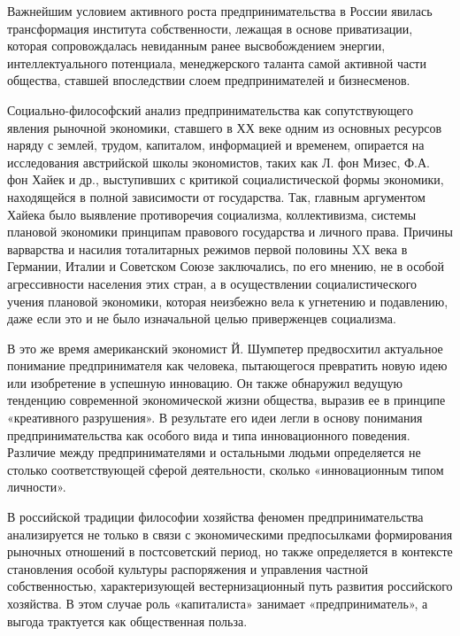 \documentclass[a4paper, 12pt]{article}%
\begin{document}
Важнейшим условием активного роста предпринимательства в России явилась трансформация института собственности, лежащая в основе приватизации, которая сопровождалась невиданным ранее высвобождением энергии, интеллектуального потенциала, менеджерского таланта самой активной части общества, ставшей впоследствии слоем предпринимателей и бизнесменов.

Социально-философский анализ предпринимательства как сопутствующего явления рыночной экономики, ставшего в ХХ веке одним из основных ресурсов наряду с землей, трудом, капиталом, информацией и временем, опирается на исследования австрийской школы экономистов, таких как Л. фон Мизес, Ф.А. фон Хайек и др., выступивших с критикой социалистической формы экономики, находящейся в полной зависимости от государства. Так, главным аргументом Хайека было выявление противоречия социализма, коллективизма, системы плановой экономики принципам правового государства и личного права. Причины варварства и насилия тоталитарных режимов первой половины $\mathrm{XX}$ века в Германии, Италии и Советском Союзе заключались, по его мнению, не в особой агрессивности населения этих стран, а в осуществлении социалистического учения плановой экономики, которая неизбежно вела к угнетению и подавлению, даже если это и не было изначальной целью приверженцев социализма.

В это же время американский экономист Й. Шумпетер предвосхитил актуальное понимание предпринимателя как человека, пытающегося превратить новую идею или изобретение в успешную инновацию. Он также обнаружил ведущую тенденцию современной экономической жизни общества, выразив ее в принципе «креативного разрушения». В результате его идеи легли в основу понимания предпринимательства как особого вида и типа инновационного поведения. Различие между предпринимателями и остальными людьми определяется не столько соответствующей сферой деятельности, сколько «инновационным типом личности».

В российской традиции философии хозяйства феномен предпринимательства анализируется не только в связи с экономическими предпосылками формирования рыночных отношений в постсоветский период, но также определяется в контексте становления особой культуры распоряжения и управления частной собственностью, характеризующей вестернизационный путь развития российского хозяйства. В этом случае роль «капиталиста» занимает «предприниматель», а выгода трактуется как общественная польза.
\end{document}

